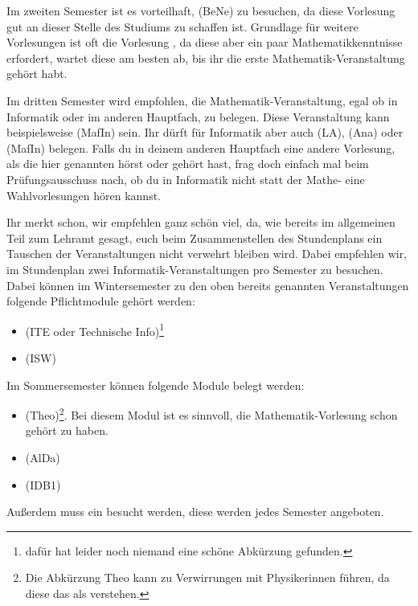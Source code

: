 Im zweiten Semester ist es vorteilhaft,  (\gls{BeNe}) zu besuchen, da diese Vorlesung gut an dieser Stelle des Studiums zu schaffen ist. Grundlage für weitere Vorlesungen ist oft die Vorlesung , da diese aber ein paar Mathematikkenntnisse erfordert, wartet diese am besten ab, bis ihr die erste Mathematik-Veranstaltung gehört habt.

Im dritten Semester wird empfohlen, die Mathematik-Veranstaltung, egal ob in Informatik oder im anderen Hauptfach, zu belegen. Diese Veranstaltung kann beispielsweise  (\gls{MafIn}) sein. Ihr dürft für Informatik aber auch  (\gls{LA}), (\gls{Ana}) oder  (\gls{MafIn}) belegen. Falls du in deinem anderen Hauptfach eine andere Vorlesung, als die hier genannten hörst oder gehört hast, frag doch einfach mal beim Prüfungsausschuss nach, ob du in Informatik nicht statt der Mathe- eine Wahlvorlesungen hören kannst.

Ihr merkt schon, wir empfehlen ganz schön viel, da, wie bereits im allgemeinen Teil zum Lehramt gesagt, euch beim Zusammenstellen des Stundenplans ein Tauschen der Veranstaltungen nicht verwehrt bleiben wird. Dabei empfehlen wir, im Stundenplan zwei Informatik-Veranstaltungen pro Semester zu besuchen. Dabei können im Wintersemester zu den oben bereits genannten Veranstaltungen folgende Pflichtmodule gehört werden:
\begin{itemize}
    \item {} (\gls{ITE} oder Technische Info)\footnote{dafür hat leider noch niemand eine schöne Abkürzung gefunden.}
    \item {} (\gls{ISW})
\end{itemize}
Im Sommersemester können folgende Module belegt werden:
\begin{itemize}
    \item {} (\gls{Theo})\footnote{Die Abkürzung \glqq{}Theo\grqq{} kann zu Verwirrungen mit Physikerinnen führen, da diese das als  verstehen.}. Bei diesem Modul ist es sinnvoll, die Mathematik-Vorlesung schon gehört zu haben.
    \item {} (\gls{AlDa})
    \item {} (\gls{IDB1})
\end{itemize}
Außerdem muss ein  besucht werden, diese werden jedes Semester angeboten.


